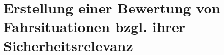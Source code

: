 
\chapter{Erstellung einer Bewertung von Fahrsituationen bzgl. ihrer Sicherheitsrelevanz}\label{chapter:Kritikalitätsskala}



